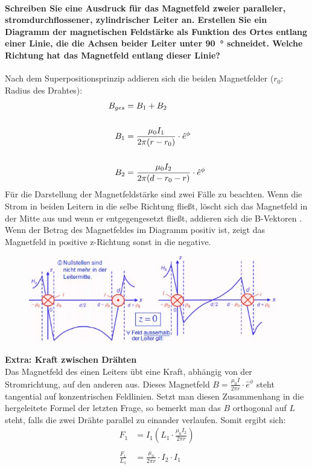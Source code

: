 \documentclass[a4paper, 11pt, ngerman, parskip=half-]{scrartcl}
\begin{document}
\paragraph{Schreiben Sie eine Ausdruck für das Magnetfeld zweier paralleler, stromdurchflossener,
    zylindrischer Leiter an. Erstellen Sie ein Diagramm der magnetischen Feldstärke als Funktion des
    Ortes entlang einer Linie, die die Achsen beider Leiter unter \SI{90}{\degree} schneidet. Welche
    Richtung hat das Magnetfeld entlang dieser Linie?}
Nach dem Superpositionsprinzip addieren sich die beiden Magnetfelder ($r_0$: Radius des Drahtes):
\begin{align}
    B_{ges} & =B_1 + B_2 \notag                                                 \\
    \notag                                                                      \\
    B_1     & = \frac{\mu_0 I_1}{2 \pi (r -r_0)} \cdot \hat{e}^{\phi} \notag    \\
    \notag                                                                      \\
    B_2     & = \frac{\mu_0 I_2}{2 \pi (d-r_0 - r)} \cdot \hat{e}^{\phi} \notag
\end{align}
Für die Darstellung der Magnetfeldstärke sind zwei Fälle zu beachten. Wenn die Strom in beiden Leitern in die selbe Richtung fließt, löscht sich das Magnetfeld in der Mitte aus und wenn er entgegengesetzt fließt, addieren sich die B-Vektoren .
Wenn der Betrag des Magnetfeldes im Diagramm positiv ist, zeigt das Magnetfeld in positive z-Richtung sonst in die negative.
\begin{figure}
    \centering
    \includegraphics[width=11cm]{image/05/5.4.jpg}
\end{figure}
\textbf{Extra: Kraft zwischen Drähten}\\
Das Magnetfeld des einen Leiters übt eine Kraft, abhängig von der Stromrichtung, auf den anderen aus.
Dieses Magnetfeld  $B = \frac{\mu_0 I}{2 \pi r} \cdot \hat{e}^{\phi}$ steht tangential auf konzentrischen Feldlinien.
Setzt man diesen Zusammenhang in die hergeleitete Formel der letzten Frage, so bemerkt man das $B$ orthogonal auf $L$ steht, falls die zwei Drähte parallel zu einander verlaufen.
Somit ergibt sich:
\begin{align}
    F_1             & = I_1(L_1 \cdot \frac{\mu_0 I_2}{2 \pi r} ) \\
    \\
    \frac{F_1}{L_1} & = \frac{\mu_0}{2 \pi r} \cdot I_2 \cdot I_1
\end{align}
\newpage
\end{document}
